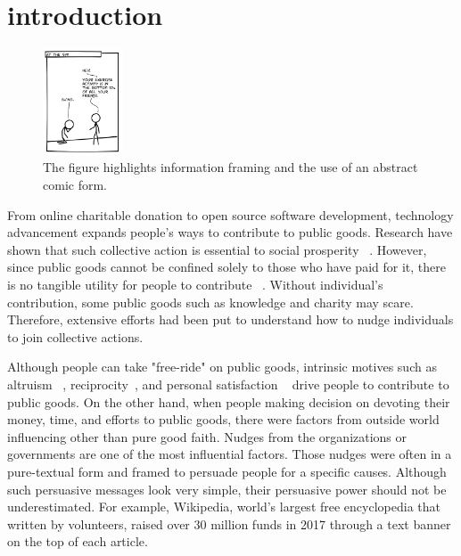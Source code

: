 



\section{introduction}
\label{sec:introduction}

\begin{figure}
    \centering
    \includegraphics[width=0.21\textwidth]{figures/intro_new.png}
  \vspace{-10pt}
  \caption{The figure highlights information framing and the use of an abstract comic form.} \label{fig:intro}
  \vspace{-10pt}
\end{figure}

From online charitable donation to open source software development, technology advancement expands people's ways to contribute to public goods. Research have shown that such collective action is essential to social prosperity ~\textcite{}. However, since public goods cannot be confined solely to those who have paid for it, there is no tangible utility for people to contribute ~\textcite{}. Without individual's contribution, some public goods such as knowledge and charity may scare. Therefore, extensive efforts had been put to understand how to nudge individuals to join collective actions.

Although people can take "free-ride" on public goods, intrinsic motives such as altruism ~\textcite{}, reciprocity~\textcite{}, and personal satisfaction ~\textcite{} drive people to contribute to public goods. On the other hand, when people making decision on devoting their money, time, and efforts to public goods, there were factors from outside world influencing other than pure good faith. Nudges from the organizations or governments are one of the most influential factors. Those nudges were often in a pure-textual form and framed to persuade people for a specific causes. Although such persuasive messages look very simple, their persuasive power should not be underestimated.
For example, Wikipedia, world's largest free encyclopedia that written by volunteers, raised over 30 million funds in 2017 through a text banner on the top of each article. 

